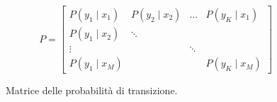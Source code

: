 \begin{figure}[htbp]
    \centering
    \[
    P =
    \begin{bmatrix}
        P(y_1 \mid x_1) & P(y_2 \mid x_2) & \dots  & P(y_K \mid x_1) \\
        P(y_1 \mid x_2) & \ddots &        &                 \\
        \vdots          &        & \ddots &                 \\
        P(y_1 \mid x_M) &        &        & P(y_K \mid x_M)
    \end{bmatrix}
    \]
    \caption{Matrice delle probabilità di transizione.}
    \label{fig:matrice_transizione}
\end{figure}